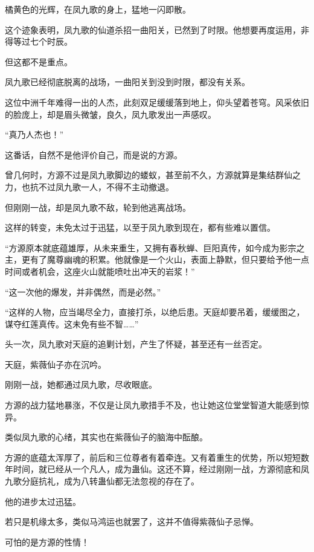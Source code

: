 
\begin{this_body}

橘黄色的光辉，在凤九歌的身上，猛地一闪即散。

这个迹象表明，凤九歌的仙道杀招一曲阳关，已然到了时限。他想要再度运用，非得等过七个时辰。

但这都不是重点。

凤九歌已经彻底脱离的战场，一曲阳关到没到时限，都没有关系。

这位中洲千年难得一出的人杰，此刻双足缓缓落到地上，仰头望着苍穹。风采依旧的脸庞上，却是眉头微皱，良久，凤九歌发出一声感叹。

“真乃人杰也！”

这番话，自然不是他评价自己，而是说的方源。

曾几何时，方源不过是凤九歌脚边的蝼蚁，甚至前不久，方源就算是集结群仙之力，也抗不过凤九歌一人，不得不主动撤退。

但刚刚一战，却是凤九歌不敌，轮到他逃离战场。

这样的转变，未免太过于迅猛，以至于凤九歌到现在，都有些难以置信。

“方源原本就底蕴雄厚，从未来重生，又拥有春秋蝉、巨阳真传，如今成为影宗之主，更有了魔尊幽魂的积累。他就像是一个火山，表面上静默，但只要给予他一点时间或者机会，这座火山就能喷吐出冲天的岩浆！”

“这一次他的爆发，并非偶然，而是必然。”

“这样的人物，应当竭尽全力，直接打杀，以绝后患。天庭却要吊着，缓缓图之，谋夺红莲真传。这未免有些不智……”

头一次，凤九歌对天庭的追剿计划，产生了怀疑，甚至还有一丝否定。

天庭，紫薇仙子亦在沉吟。

刚刚一战，她都通过凤九歌，尽收眼底。

方源的战力猛地暴涨，不仅是让凤九歌措手不及，也让她这位堂堂智道大能感到惊异。

类似凤九歌的心绪，其实也在紫薇仙子的脑海中酝酿。

方源的底蕴太浑厚了，前后和三位尊者有着牵连。又有着重生的优势，所以短短数年时间，就已经从一个凡人，成为蛊仙。这还不算，经过刚刚一战，方源彻底和凤九歌分庭抗礼，成为八转蛊仙都无法忽视的存在了。

他的进步太过迅猛。

若只是机缘太多，类似马鸿运也就罢了，这并不值得紫薇仙子忌惮。

可怕的是方源的性情！


\end{this_body}
